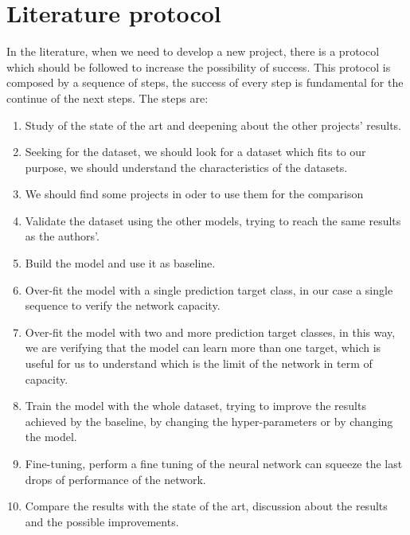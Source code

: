 \section{Literature protocol}\label{sec:literature-protocol}

In the literature, when we need to develop a new project, there is a protocol which should be followed to increase the possibility of success.
This protocol is composed by a sequence of steps, the success of every step is fundamental for the continue of the next steps.
The steps are:
\begin{enumerate}
    \item Study of the state of the art and deepening about the other projects' results.
    \item Seeking for the dataset, we should look for a dataset which fits to our purpose, we should understand the characteristics of the datasets.
    \item We should find some projects in oder to use them for the comparison
    \item Validate the dataset using the other models, trying to reach the same results as the authors'.
    \item Build the model and use it as baseline.
    \item Over-fit the model with a single prediction target class, in our case a single sequence to verify the network capacity.
    \item Over-fit the model with two and more prediction target classes, in this way, we are verifying that the model can learn more than one target, which is useful for us to understand which is the limit of the network in term of capacity.
    \item Train the model with the whole dataset, trying to improve the results achieved by the baseline, by changing the hyper-parameters or by changing the model.
    \item Fine-tuning, perform a fine tuning of the neural network can squeeze the last drops of performance of the network.
    \item Compare the results with the state of the art, discussion about the results and the possible improvements.
\end{enumerate}